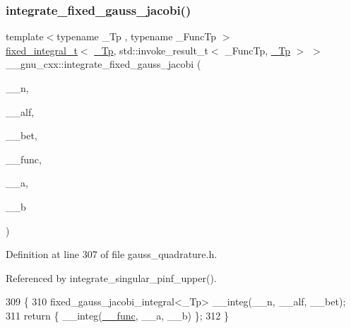 \subsubsection{\texorpdfstring{integrate\+\_\+fixed\+\_\+gauss\+\_\+jacobi()}{integrate\_fixed\_gauss\_jacobi()}}
{\footnotesize\ttfamily template$<$typename \+\_\+\+Tp , typename \+\_\+\+Func\+Tp $>$ \\
\hyperlink{struct____gnu__cxx_1_1fixed__integral__t}{fixed\+\_\+integral\+\_\+t}$<$ \hyperlink{namespace____gnu__cxx_a3b19a9c800ca194374ef9172290f7d79}{\+\_\+\+Tp}, std\+::invoke\+\_\+result\+\_\+t$<$ \+\_\+\+Func\+Tp, \hyperlink{namespace____gnu__cxx_a3b19a9c800ca194374ef9172290f7d79}{\+\_\+\+Tp} $>$ $>$ \+\_\+\+\_\+gnu\+\_\+cxx\+::integrate\+\_\+fixed\+\_\+gauss\+\_\+jacobi (\begin{DoxyParamCaption}\item[{int}]{\+\_\+\+\_\+n,  }\item[{\hyperlink{namespace____gnu__cxx_a3b19a9c800ca194374ef9172290f7d79}{\+\_\+\+Tp}}]{\+\_\+\+\_\+alf,  }\item[{\hyperlink{namespace____gnu__cxx_a3b19a9c800ca194374ef9172290f7d79}{\+\_\+\+Tp}}]{\+\_\+\+\_\+bet,  }\item[{\+\_\+\+Func\+Tp}]{\+\_\+\+\_\+func,  }\item[{\hyperlink{namespace____gnu__cxx_a3b19a9c800ca194374ef9172290f7d79}{\+\_\+\+Tp}}]{\+\_\+\+\_\+a,  }\item[{\hyperlink{namespace____gnu__cxx_a3b19a9c800ca194374ef9172290f7d79}{\+\_\+\+Tp}}]{\+\_\+\+\_\+b }\end{DoxyParamCaption})}



Definition at line 307 of file gauss\+\_\+quadrature.\+h.



Referenced by integrate\+\_\+singular\+\_\+pinf\+\_\+upper().


\begin{DoxyCode}
309     \{
310       fixed\_gauss\_jacobi\_integral<\_Tp> \_\_integ(\_\_n, \_\_alf, \_\_bet);
311       \textcolor{keywordflow}{return} \{ \_\_integ(\hyperlink{namespace____gnu__cxx_af2b2f0c7a2ae72b922b1afefae5a65b2}{\_\_func}, \_\_a, \_\_b) \};
312     \}
\end{DoxyCode}
\mbox{\label{namespace____gnu__cxx_a9f7832337c163702c3ede5dbceb3c8e0}} 
